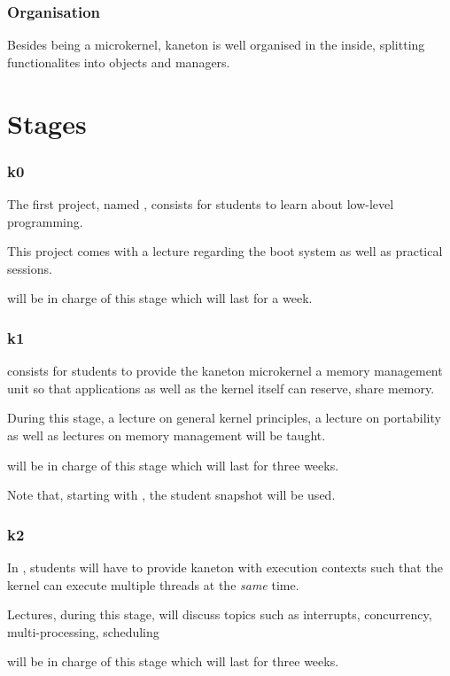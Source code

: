 
\begin{frame}
  \frametitle{Organisation}

  Besides being a microkernel, kaneton is well organised in the inside,
  splitting functionalites into objects and managers.
\end{frame}

%
%

\section{Stages}


\begin{frame}
  \frametitle{k0}

  The first project, named , consists for students to learn
  about low-level programming.

  \-

  This project comes with a lecture regarding the boot system as well
  as practical sessions.

  \-

   will be in charge of this stage which will last for
  a week.
\end{frame}


\begin{frame}
  \frametitle{k1}

   consists for students to provide the kaneton microkernel a
  memory management unit so that applications as well as the kernel itself
  can reserve, share \etc{} memory.

  \-

  During this stage, a lecture on general kernel principles, a lecture on
  portability as well as lectures on memory management will be taught.

  \-

   will be in charge of this stage which will last
  for three weeks.

  \-

  Note that, starting with , the student snapshot will be used.
\end{frame}


\begin{frame}
  \frametitle{k2}

  In , students will have to provide kaneton with execution contexts
  such that the kernel can execute multiple threads at the \textit{same} time.

  \-

  Lectures, during this stage, will discuss topics such as interrupts,
  concurrency, multi-processing, scheduling \etc{}

  \-

   will be in charge of this stage which will last for
  three weeks.
\end{frame}

